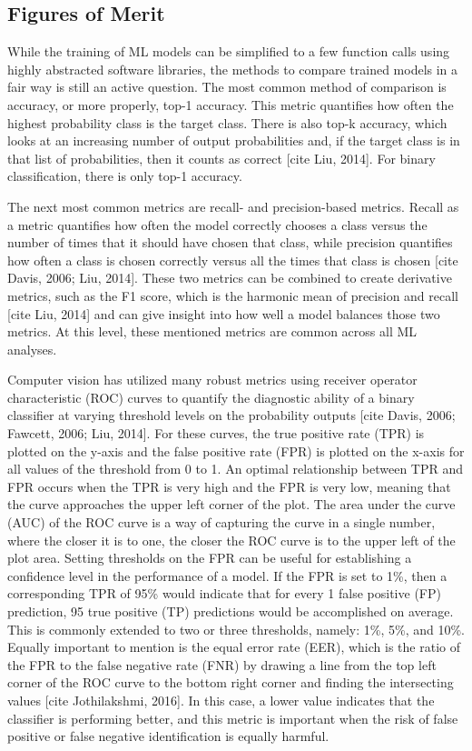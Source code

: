 \documentclass[12pt]{iopart}
\begin{document}
\subsection*{Figures of Merit}

While the training of ML models can be simplified to a few function calls using highly abstracted software libraries, the methods to compare trained models in a fair way is still an active question.  The most common method of comparison is accuracy, or more properly, top-1 accuracy.  This metric quantifies how often the highest probability class is the target class.  There is also top-k accuracy, which looks at an increasing number of output probabilities and, if the target class is in that list of probabilities, then it counts as correct [cite Liu, 2014].  For binary classification, there is only top-1 accuracy.  

The next most common metrics are recall- and precision-based metrics.  Recall as a metric quantifies how often the model correctly chooses a class versus the number of times that it should have chosen that class, while precision quantifies how often a class is chosen correctly versus all the times that class is chosen [cite Davis, 2006; Liu, 2014].  These two metrics can be combined to create derivative metrics, such as the F1 score, which is the harmonic mean of precision and recall [cite Liu, 2014] and can give insight into how well a model balances those two metrics.  At this level, these mentioned metrics are common across all ML analyses.  

Computer vision has utilized many robust metrics using receiver operator characteristic (ROC) curves to quantify the diagnostic ability of a binary classifier at varying threshold levels on the probability outputs [cite Davis, 2006; Fawcett, 2006; Liu, 2014].  For these curves, the true positive rate (TPR) is plotted on the y-axis and the false positive rate (FPR) is plotted on the x-axis for all values of the threshold from 0 to 1.  An optimal relationship between TPR and FPR occurs when the TPR is very high and the FPR is very low, meaning that the curve approaches the upper left corner of the plot.  The area under the curve (AUC) of the ROC curve is a way of capturing the curve in a single number, where the closer it is to one, the closer the ROC curve is to the upper left of the plot area.  Setting thresholds on the FPR can be useful for establishing a confidence level in the performance of a model.  If the FPR is set to 1\%, then a corresponding TPR of 95\% would indicate that for every 1 false positive (FP) prediction, 95 true positive (TP) predictions would be accomplished on average.  This is commonly extended to two or three thresholds, namely: 1\%, 5\%, and 10\%.  Equally important to mention is the equal error rate (EER), which is the ratio of the FPR to the false negative rate (FNR) by drawing a line from the top left corner of the ROC curve to the bottom right corner and finding the intersecting values [cite Jothilakshmi, 2016].  In this case, a lower value indicates that the classifier is performing better, and this metric is important when the risk of false positive or false negative identification is equally harmful.
\end{document}
